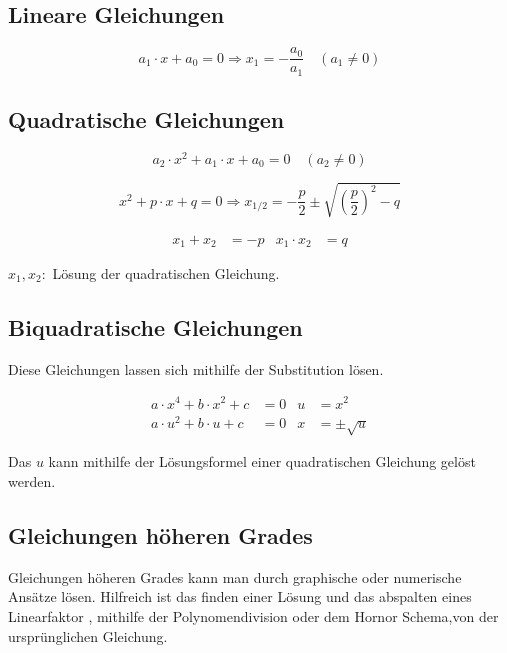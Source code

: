 \subsection{Lineare Gleichungen}
\begin{shaded}
 \begin{equation}
  a_1\cdot x+a_0=0 \Rightarrow x_1=-\frac{a_0}{a_1}\quad (a_1\neq 0)
 \end{equation}
\end{shaded}

\subsection{Quadratische Gleichungen}
\begin{shaded}
 \begin{equation}
  a_2\cdot x^2+a_1\cdot x+a_0=0\quad (a_2\neq0)
 \end{equation}
\end{shaded}

\begin{shaded}
 \begin{equation}
  x^2+p\cdot x+q=0\Rightarrow x_{1/2}=-\frac{p}{2}\pm\sqrt{\left(\frac{p}{2}\right)^2-q}
 \end{equation}
\end{shaded}

\begin{shaded}
 \begin{align}
  x_1+x_2&=-p& x_1\cdot x_2&=q 
 \end{align}
\end{shaded}
$x_1, x_2:$ Lösung der quadratischen Gleichung.

\subsection{Biquadratische Gleichungen}
Diese Gleichungen lassen sich mithilfe der Substitution lösen.
\begin{shaded}
 \begin{align}
  a\cdot x^4+b\cdot x^2 +c&=0&u&=x^2 \\
  a\cdot u^2+b\cdot u +c&=0&x&=\pm\sqrt{u}
 \end{align}
\end{shaded}
Das $u$ kann mithilfe der Lösungsformel einer quadratischen Gleichung gelöst werden.

\subsection{Gleichungen höheren Grades} 
Gleichungen höheren Grades kann man durch graphische oder numerische Ansätze lösen. Hilfreich ist das finden einer Lösung und das abspalten eines Linearfaktor
, mithilfe der Polynomendivision oder dem Hornor Schema,von der ursprünglichen Gleichung.

